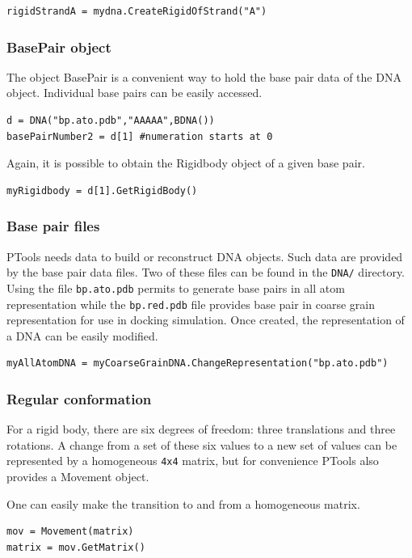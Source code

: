 \documentclass[12pt,a4paper]{article}
\begin{document}
\begin{verbatim}
rigidStrandA = mydna.CreateRigidOfStrand("A")
\end{verbatim} 
\subsubsection{BasePair object}
The object BasePair is a convenient way to hold the base pair data of the DNA object. Individual base pairs can be easily accessed.
\begin{verbatim}
d = DNA("bp.ato.pdb","AAAAA",BDNA())
basePairNumber2 = d[1] #numeration starts at 0
\end{verbatim} 

Again, it is possible to obtain the Rigidbody object of a given base pair.
\begin{verbatim}
myRigidbody = d[1].GetRigidBody() 
\end{verbatim} 

\subsubsection{Base pair files}
PTools needs data to build or reconstruct DNA objects. Such data are provided by the base pair data files. Two of these files can be found in the {\tt DNA/} directory. Using the file {\tt bp.ato.pdb} permits to generate base pairs in all atom representation while the {\tt bp.red.pdb} file provides base pair in coarse grain representation for use in docking simulation. 
Once created, the representation of a DNA can be easily modified.

\begin{verbatim}
myAllAtomDNA = myCoarseGrainDNA.ChangeRepresentation("bp.ato.pdb")
\end{verbatim} 

\subsubsection{Regular conformation}
For a rigid body, there are six degrees of freedom: three translations and three rotations. A change from a set of these six values to a new set of values can be represented by a homogeneous \texttt{4x4} matrix, but for convenience PTools also provides a Movement object.
 
One can easily make the transition to and from a homogeneous matrix.

\begin{verbatim}
mov = Movement(matrix)
matrix = mov.GetMatrix()
\end{verbatim} 
\end{document}
